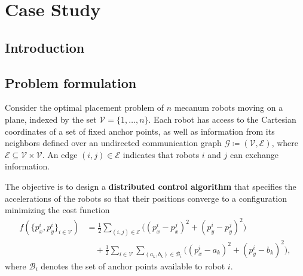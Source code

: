 \chapter{Case Study}


\section{Introduction}

\section{Problem formulation}
\begin{opt}
Consider the optimal placement problem of \(n\) mecanum robots moving on a plane, indexed by the set \(\mathcal{V} = \{1,\ldots,n\}\). Each robot has access to the Cartesian coordinates of a set of fixed anchor points, as well as information from its neighbors defined over an undirected communication graph \(\mathcal{G} \coloneqq (\mathcal{V}, \mathcal{E})\), where \(\mathcal{E}\subseteq \mathcal{V}\times\mathcal{V}\). An edge \((i,j)\in\mathcal{E}\) indicates that robots \(i\) and \(j\) can exchange information.

The objective is to design a \textbf{distributed control algorithm} that specifies the accelerations of the robots so that their positions converge to a configuration minimizing the cost function
\begin{equation}
\begin{split}
    f(\{p_x^i, p_y^i\}_{i\in\mathcal{V}}) 
    &= \frac{1}{2}\sum_{(i,j) \in \mathcal{E}} \Big((p_x^i - p_x^j)^2 + (p_y^i - p_y^j)^2\Big) \\
    &\quad + \frac{1}{2} \sum_{i\in\mathcal{V}} \sum_{(a_k,b_k)\in \mathcal{B}_i} \Big((p_x^i - a_k)^2 + (p_y^i - b_k)^2\Big),
\end{split}
\end{equation}
where \(\mathcal{B}_i\) denotes the set of anchor points available to robot \(i\).
\end{opt}


